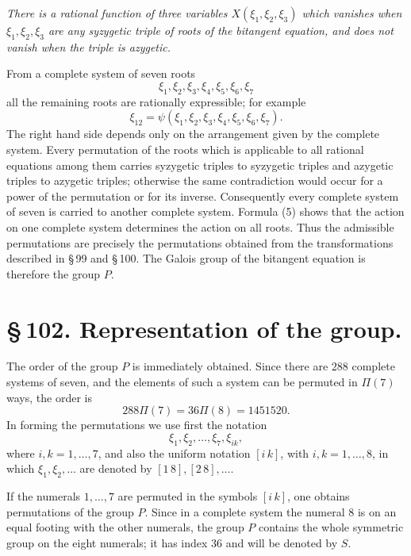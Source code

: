 \documentclass[11pt]{article}
\providecommand{\pair}[2]{[#1\,#2]}
\begin{document}
\emph{There is a rational function of three variables \(X(\xi_1,\xi_2,\xi_3)\) which vanishes when \(\xi_1,\xi_2,\xi_3\) are any syzygetic triple of roots of the bitangent equation, and does not vanish when the triple is azygetic.}

From a complete system of seven roots
\begin{equation}
 \xi_1,\xi_2,\xi_3,\xi_4,\xi_5,\xi_6,\xi_7 \tag{4}
\end{equation}
all the remaining roots are rationally expressible; for example
\begin{equation}
 \xi_{12}=\psi(\xi_1,\xi_2,\xi_3,\xi_4,\xi_5,\xi_6,\xi_7). \tag{5}
\end{equation}
The right hand side depends only on the arrangement given by the complete system. Every permutation of the roots which is applicable to all rational equations among them carries syzygetic triples to syzygetic triples and azygetic triples to azygetic triples; otherwise the same contradiction would occur for a power of the permutation or for its inverse. Consequently every complete system of seven is carried to another complete system. Formula (5) shows that the action on one complete system determines the action on all roots. Thus the admissible permutations are precisely the permutations obtained from the transformations described in \S\,99 and \S\,100. The Galois group of the bitangent equation is therefore the group \(P\).

\section*{\S\,102. Representation of the group.}

The order of the group \(P\) is immediately obtained. Since there are \(288\) complete systems of seven, and the elements of such a system can be permuted in \(\Pi(7)\) ways, the order is
\[
 288\Pi(7)=36\Pi(8)=1451520.
\]
In forming the permutations we use first the notation
\begin{equation}
 \xi_1,\xi_2,\ldots,\xi_7,\xi_{ik}, \tag{1}
\end{equation}
where \(i,k=1,
\ldots,7\), and also the uniform notation \(\pair{i}{k}\), with \(i,k=1,
\ldots,8\), in which \(\xi_1,\xi_2,
\ldots\) are denoted by \(\pair{1}{8},\pair{2}{8},
\ldots\).

If the numerals \(1,
\ldots,7\) are permuted in the symbols \(\pair{i}{k}\), one obtains permutations of the group \(P\). Since in a complete system the numeral 8 is on an equal footing with the other numerals, the group \(P\) contains the whole symmetric group on the eight numerals; it has index 36 and will be denoted by \(S\).
\end{document}
